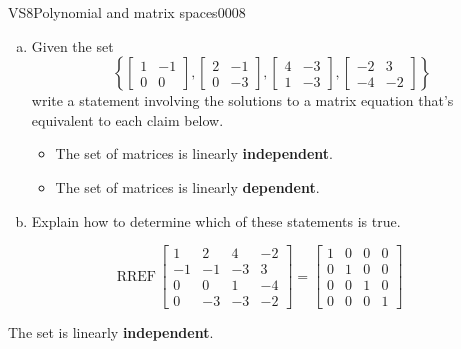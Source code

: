\begin{exercise}{VS8}{Polynomial and matrix spaces}{0008} 
\begin{exerciseStatement} 

\begin{enumerate}[(a)]
\item  

 Given the set \[\left\{ \left[\begin{array}{cc}
1 & -1 \\
0 & 0
\end{array}\right] , \left[\begin{array}{cc}
2 & -1 \\
0 & -3
\end{array}\right] , \left[\begin{array}{cc}
4 & -3 \\
1 & -3
\end{array}\right] , \left[\begin{array}{cc}
-2 & 3 \\
-4 & -2
\end{array}\right] \right\}\] write a statement involving the solutions to a matrix equation that's equivalent to each claim below. 

 

\begin{itemize}
\item  

 The set of matrices is linearly \textbf{independent}. 

 
\item  

 The set of matrices is linearly \textbf{dependent}. 

 
\end{itemize}

     
\item  

 Explain how to determine which of these statements is true. 

 
\end{enumerate}

     \end{exerciseStatement}
 \begin{exerciseAnswer} 

 \[
\mathrm{RREF}\, \left[\begin{array}{cccc}
1 & 2 & 4 & -2 \\
-1 & -1 & -3 & 3 \\
0 & 0 & 1 & -4 \\
0 & -3 & -3 & -2
\end{array}\right] = \left[\begin{array}{cccc}
1 & 0 & 0 & 0 \\
0 & 1 & 0 & 0 \\
0 & 0 & 1 & 0 \\
0 & 0 & 0 & 1
\end{array}\right]
            \] 

 

 The set is linearly \textbf{independent}. 

 \end{exerciseAnswer}
 \end{exercise}



